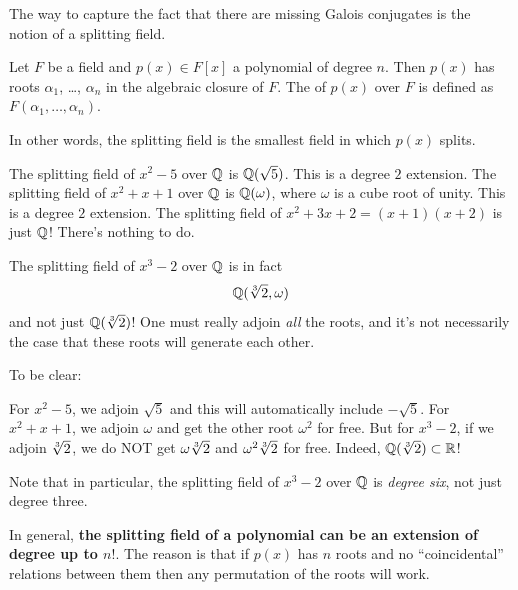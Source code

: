 The way to capture the fact that there are missing Galois conjugates
is the notion of a splitting field.
\begin{definition}
	Let $F$ be a field and $p(x) \in F[x]$ a polynomial of degree $n$.
	Then $p(x)$ has roots $\alpha_1$, \dots, $\alpha_n$ in the algebraic closure of $F$.
	The  of $p(x)$ over $F$ is defined as $F(\alpha_1, \dots, \alpha_n)$.
\end{definition}
In other words, the splitting field is the smallest field in which $p(x)$ splits.
\begin{example}
	\listhack
	\begin{enumerate}[(a)]
		\ii The splitting field of $x^2 - 5$ over $\mathbb Q$ is $\mathbb Q(\sqrt 5)$.
		This is a degree $2$ extension.
		\ii The splitting field of $x^2+x+1$ over $\mathbb Q$ is $\mathbb Q(\omega)$,
		where $\omega$ is a cube root of unity.
		This is a degree $2$ extension.
		\ii The splitting field of $x^2+3x+2 = (x+1)(x+2)$ is just $\mathbb Q$!
		There's nothing to do.
	\end{enumerate}
\end{example}
\begin{example}
	The splitting field of $x^3 - 2$ over $\mathbb Q$ is in fact
	\[ \mathbb Q( \sqrt[3]{2}, \omega ) \]
	and not just $\mathbb Q(\sqrt[3]{2})$!
	One must really adjoin \emph{all} the roots, and it's not necessarily the case that
	these roots will generate each other.

	To be clear:
	\begin{itemize}
	\ii For $x^2-5$, we adjoin $\sqrt 5$ and this will automatically include $-\sqrt 5$.
	\ii For $x^2+x+1$, we adjoin $\omega$ and get the other root $\omega^2$ for free.
	\ii But for $x^3-2$, if we adjoin $\sqrt[3]{2}$,
	we do NOT get $\omega\sqrt[3]{2}$ and $\omega^2\sqrt[3]{2}$ for free.
	Indeed, $\mathbb Q(\sqrt[3]{2}) \subset \mathbb R$!
	\end{itemize}
	Note that in particular, the splitting field of
	$x^3-2$ over $\mathbb Q$ is \emph{degree six}, not just degree three.
\end{example}

In general,
\textbf{the splitting field of a polynomial can be an extension of degree up to $n!$}.
The reason is that if $p(x)$ has $n$ roots and no
``coincidental'' relations between them
then any permutation of the roots will work.

